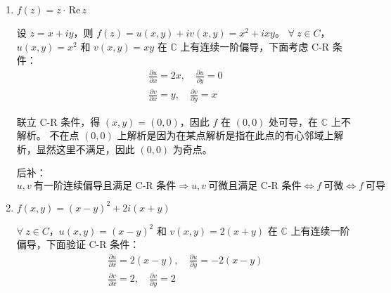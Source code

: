\documentclass[UTF8]{report}
\def\Re{\mathrm{\,Re\,}}
\def\C{\mathbb{C}}
\theoremstyle{MyLineTheoremStyle} %
\theoremstyle{MyBlockTheoremStyle} %
\theoremstyle{MySubsubsectionStyle} %
\begin{document}
\begin{enumerate}
\item $ f(z) = z\cdot \Re z$

设 $z = x + iy$，则 $f(z) = u(x,y) + iv(x,y) = x^2 + ixy$。
$\forall\  z \in C$，$u(x,y) = x^2$ 和 $v(x,y) = xy$ 在 $\C$ 上有连续一阶偏导，下面考虑 C-R 条件：
\begin{gather}
\frac{\partial u }{\partial x } = 2x, \quad \frac{\partial u }{\partial y } = 0 \\ 
\frac{\partial v }{\partial x } = y, \quad \frac{\partial v }{\partial y } = x
\end{gather}

联立 C-R 条件，得 $(x,y) = (0,0)$，因此 $f$ 在 $(0,0)$ 处可导，在 $\C$ 上不解析。
不在点 $(0,0)$ 上解析是因为在某点解析是指在此点的有心邻域上解析，显然这里不满足，因此 $(0,0)$ 为奇点。


{\par\color{gray}\small
后补：
\begin{equation*}
u,v\ \text{有一阶连续偏导且满足 C-R 条件} \Longrightarrow  u,v\ \text{可微且满足 C-R 条件} \Longleftrightarrow f\ \text{可微} \Longleftrightarrow 
f\ \text{可导}
\end{equation*}
\par}



\item $f(x,y) = (x-y)^2 + 2i(x+y)$

$\forall\  z \in C$，$u(x,y) = (x-y)^2$ 和 $v(x,y) = 2(x+y)$ 在 $\C$ 上有连续一阶偏导，下面验证 C-R 条件：
\begin{gather}
\frac{\partial u }{\partial x } = 2(x-y), \quad \frac{\partial u }{\partial y } = -2(x-y) \\ 
\frac{\partial v }{\partial x } = 2, \quad \frac{\partial v }{\partial y } = 2
\end{gather}


\end{enumerate}
\end{document}
